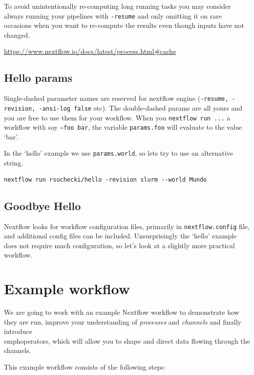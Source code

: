 To avoid unintentionally re-computing long running tasks you may consider 
always running your pipelines with \texttt{-resume} and only omitting it
on rare occasions when you want to re-compute the results
even though inputs have not changed. 

\url{https://www.nextflow.io/docs/latest/process.html#cache}

\subsection{Hello params}

Single-dashed parameter names are reserved for nextflow engine (\texttt{-resume, -revision, -ansi-log false} etc). 
The double-dashed params are all yours and you are free to use them for your workflow. 
When you \texttt{nextflow run ...} a workflow with say \texttt{--foo bar}, 
the variable \texttt{params.foo} will evaluate to the value `bar'.

In the `hello' example we use \texttt{params.world}, so lets try to use an alternative string.
\begin{steps}
\begin{lstlisting}
nextflow run rsuchecki/hello -revision slurm --world Mundo
\end{lstlisting}
\end{steps}

\subsection{Goodbye Hello}

Nextflow looks for workflow configuration files, primarily in \texttt{nextflow.config} file, and additional config files can be included. Unsurprisingly the `hello' example does not require much configuration, so let's look at a slightly more practical workflow.


\newpage

\section{Example workflow}

We are going to work with an example Nextflow workflow to demonstrate how they are run, 
improve your understanding of \emph{processes} and \emph{channels} and finally introduce \\emph{operators}, which will allow you to shape and direct data flowing through the channels. 


This example workflow consists of the following steps:

